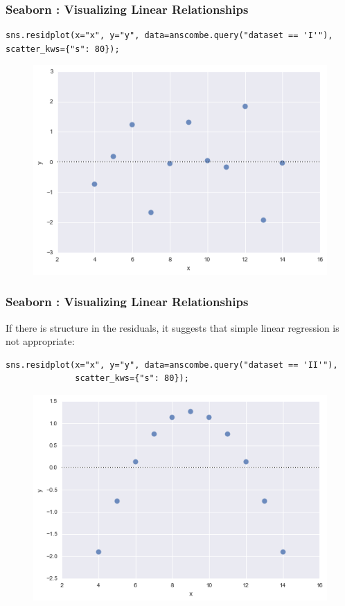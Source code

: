 \documentclass{beamer}
\begin{document}
\begin{frame}[fragile]
	\frametitle{Seaborn : Visualizing Linear Relationships}
	\large
\begin{verbatim}
sns.residplot(x="x", y="y", data=anscombe.query("dataset == 'I'"),
scatter_kws={"s": 80});
\end{verbatim}

\begin{figure}
	\centering
	\includegraphics[width=0.7\linewidth]{images/regression_35_0}
\end{figure}
\end{frame}
\begin{frame}[fragile]
		\frametitle{Seaborn : Visualizing Linear Relationships}
	\large
If there is structure in the residuals, it suggests that simple linear regression is not appropriate:
\begin{verbatim}
sns.residplot(x="x", y="y", data=anscombe.query("dataset == 'II'"),
              scatter_kws={"s": 80});
\end{verbatim}
\begin{figure}
\centering
\includegraphics[width=0.7\linewidth]{images/regression_37_0}
\end{figure}

\end{frame}
\end{document}
